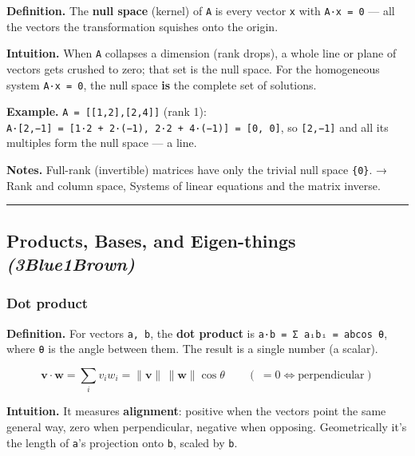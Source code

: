 \documentclass[
  10pt,
  letterpaper,
  onecolumn]{article}
\begin{document}
\textbf{Definition.} The \textbf{null space} (kernel) of \texttt{A} is
every vector \texttt{x} with \texttt{A·x\ =\ 0} --- all the vectors the
transformation squishes onto the origin.

\textbf{Intuition.} When \texttt{A} collapses a dimension (rank drops),
a whole line or plane of vectors gets crushed to zero; that set is the
null space. For the homogeneous system \texttt{A·x\ =\ 0}, the null
space \textbf{is} the complete set of solutions.

\textbf{Example.} \texttt{A\ =\ {[}{[}1,2{]},{[}2,4{]}{]}} (rank 1):
\texttt{A·{[}2,−1{]}\ =\ {[}1·2\ +\ 2·(−1),\ 2·2\ +\ 4·(−1){]}\ =\ {[}0,\ 0{]}},
so \texttt{{[}2,−1{]}} and all its multiples form the null space --- a
line.

\textbf{Notes.} Full-rank (invertible) matrices have only the trivial
null space \texttt{\{0\}}. → Rank and column space, Systems of linear
equations and the matrix inverse.

\begin{center}\rule{0.5\linewidth}{0.5pt}\end{center}

\hypertarget{products-bases-and-eigen-things-3blue1brown}{%
\subsection{\texorpdfstring{Products, Bases, and Eigen-things
\emph{(3Blue1Brown)}}{Products, Bases, and Eigen-things (3Blue1Brown)}}\label{products-bases-and-eigen-things-3blue1brown}}

\hypertarget{dot-product}{%
\subsubsection{Dot product}\label{dot-product}}

\textbf{Definition.} For vectors \texttt{a,\ b}, the \textbf{dot
product} is
\texttt{a·b\ =\ Σ\ aᵢbᵢ\ =\ \textbar{}a\textbar{}\textbar{}b\textbar{}cos\ θ},
where \texttt{θ} is the angle between them. The result is a single
number (a scalar).

\begin{equation*}
\mathbf{v}\cdot\mathbf{w}=\sum_i v_iw_i=\|\mathbf{v}\|\,\|\mathbf{w}\|\cos\theta
\qquad
(\;=0 \iff \text{perpendicular})
\end{equation*}

\textbf{Intuition.} It measures \textbf{alignment}: positive when the
vectors point the same general way, zero when perpendicular, negative
when opposing. Geometrically it's the length of \texttt{a}'s projection
onto \texttt{b}, scaled by \texttt{\textbar{}b\textbar{}}.
\end{document}
